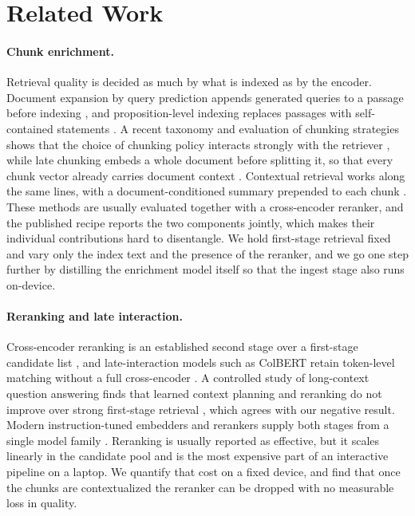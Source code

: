 \section{Related Work}
\label{sec:related}

\paragraph{Chunk enrichment.}
Retrieval quality is decided as much by what is indexed as by the encoder.
Document expansion by query prediction appends generated queries to a passage
before indexing \citep{nogueira2019document}, and proposition-level indexing
replaces passages with self-contained statements
\citep{chen2024densex}. A recent taxonomy and evaluation of chunking strategies
shows that the choice of chunking policy interacts strongly with the retriever
\citep{zhou2026chunking}, while late chunking embeds a whole document before
splitting it, so that every chunk vector already carries document context
\citep{mortezaagha2026latechunking}. Contextual retrieval works along the same
lines, with a document-conditioned summary prepended to each chunk
\citep{anthropic2024contextual}. These methods are usually evaluated together
with a cross-encoder reranker, and the published recipe reports the two
components jointly, which makes their individual contributions hard to
disentangle. We hold first-stage retrieval fixed and vary only the index text and the
presence of the reranker, and we go one step further by distilling the
enrichment model itself so that the ingest stage also runs on-device.

\paragraph{Reranking and late interaction.}
Cross-encoder reranking is an established second stage over a first-stage
candidate list \citep{nogueira2019passage}, and late-interaction models such as
ColBERT retain token-level matching without a full cross-encoder
\citep{khattab2020colbert}. A controlled study of long-context question
answering finds that learned context planning and reranking do not improve over
strong first-stage retrieval \citep{li2026reranking}, which agrees with our
negative result. Modern instruction-tuned embedders and rerankers supply both
stages from a single model family \citep{qwen3embedding}. Reranking is usually
reported as effective, but it scales linearly in the candidate pool and is the
most expensive part of an interactive pipeline on a laptop. We quantify that
cost on a fixed device, and find that once the chunks are contextualized the
reranker can be dropped with no measurable loss in quality.

